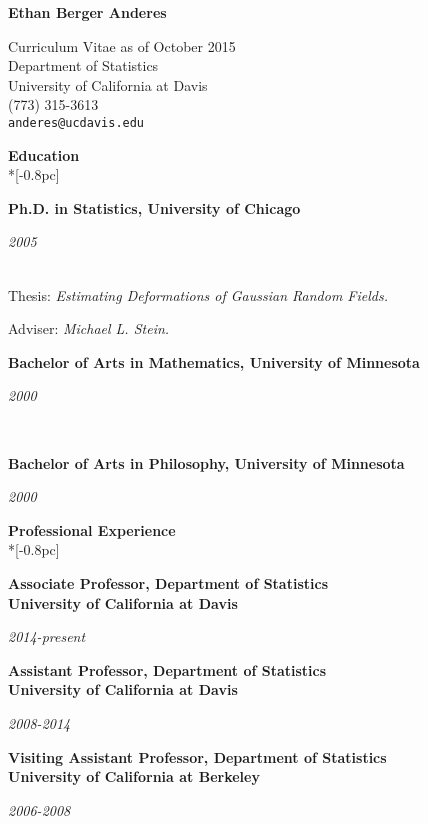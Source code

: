 \documentclass[11pt]{article}
\newcommand{\head}[1]{
  \vspace{10pt}
  {\Large \bf #1} \\*[-0.8pc]
  \underline{\hspace{6.07in}}}
\newcommand{\datedentry}[2]{
  \vspace{5pt}
  \begin{minipage}{5in}{\textbf{#1}}\end{minipage}
  \hfill
  \begin{minipage}{1in}{\hfill\textit{#2}}\end{minipage}
  }
\begin{document}
\begin{center}
  \begin{Large}
    \textbf{Ethan Berger Anderes} \\ \vspace{5pt}
  \end{Large}
  Curriculum Vitae as of October 2015\\
  Department of Statistics\\
  University of California at Davis\\
  (773) 315-3613\\
  \texttt{anderes@ucdavis.edu}\\
\end{center}

\flushleft
\head{Education}%


\datedentry{Ph.D. in Statistics, University of Chicago}{ 2005}\\
\vspace{5pt}
Thesis: %
{\sl Estimating Deformations of Gaussian Random Fields.}

Adviser: {\sl Michael L. Stein.}

\vspace{2pt}

\datedentry{Bachelor of Arts in Mathematics, University of Minnesota }{2000}\\
\vspace{4pt}
\datedentry{Bachelor of Arts in Philosophy, University of Minnesota }{2000}

\head{Professional Experience}%


\datedentry{Associate Professor, Department of Statistics\\
University of California at Davis}{2014-present}

\vspace{7pt}


\datedentry{Assistant Professor, Department of Statistics\\
University of California at Davis}{2008-2014}

\vspace{7pt}

\datedentry{Visiting Assistant Professor, Department of Statistics\\
University of California at Berkeley}{2006-2008}

\vspace{7pt}
\end{document}
